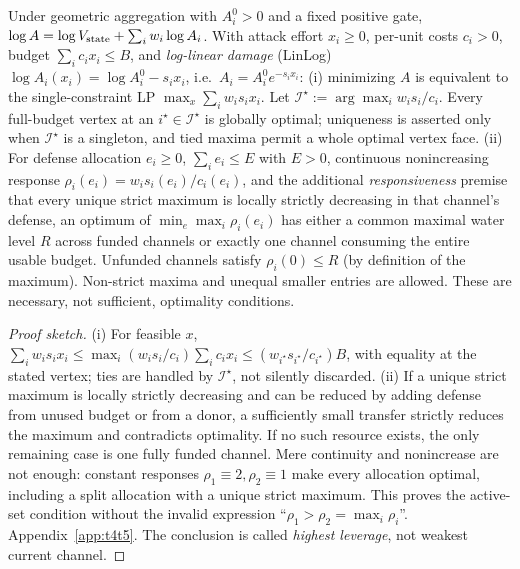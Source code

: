 \begin{theorem}\label{thm:t4}
Under geometric aggregation with $A_i^0>0$ and a fixed positive gate,
$\log A=\log V_{\mathrm{state}}+\sum_i w_i\log A_i$. With attack effort $x_i\ge0$,
per-unit costs $c_i>0$, budget $\sum_i c_ix_i\le B$, and \emph{log-linear
damage} \textup{(LinLog)} $\log A_i(x_i)=\log A_i^0-s_ix_i$, i.e.\
$A_i=A_i^0e^{-s_ix_i}$:
\textup{(i)} minimizing $A$ is equivalent to the single-constraint LP
$\max_x\sum_iw_is_ix_i$. Let
$\mathcal I^\star:=\arg\max_iw_is_i/c_i$. Every full-budget vertex at an
$i^\star\in\mathcal I^\star$ is globally optimal; uniqueness is asserted only
when $\mathcal I^\star$ is a singleton, and tied maxima permit a whole optimal
vertex face. \textup{(ii)} For defense allocation $e_i\ge0$,
$\sum_i e_i\le E$ with $E>0$, continuous nonincreasing response
$\rho_i(e_i)=w_is_i(e_i)/c_i(e_i)$, and the additional \emph{responsiveness}
premise that every unique strict maximum is locally strictly decreasing in
that channel's defense, an optimum of $\min_e\max_i\rho_i(e_i)$ has either a
common maximal water level $R$ across funded channels or exactly one channel
consuming the entire usable budget. Unfunded channels satisfy
$\rho_i(0)\le R$ (by definition of the maximum). Non-strict maxima and unequal
smaller entries are allowed. These are necessary, not sufficient, optimality
conditions.
\end{theorem}
\begin{proof}[Proof sketch]
(i) For feasible $x$, $\sum_iw_is_ix_i\le\max_i(w_is_i/c_i)\sum_i c_ix_i
\le(w_{i^\star}s_{i^\star}/c_{i^\star})B$, with equality at the stated vertex;
ties are handled by $\mathcal I^\star$, not silently discarded. (ii) If a
unique strict maximum is locally strictly decreasing and can be reduced by
adding defense from unused budget or from a donor, a sufficiently small
transfer strictly reduces the maximum and contradicts optimality. If no such
resource exists, the only remaining case is one fully funded channel. Mere
continuity and nonincrease are not enough: constant responses
$\rho_1\equiv2,\rho_2\equiv1$ make every allocation optimal, including a split
allocation with a unique strict maximum. This proves the active-set condition
without the invalid expression ``$\rho_1>\rho_2=\max_i\rho_i$''.
Appendix~\ref{app:t4t5}. The conclusion is called \emph{highest leverage},
not weakest current channel.
\end{proof}

